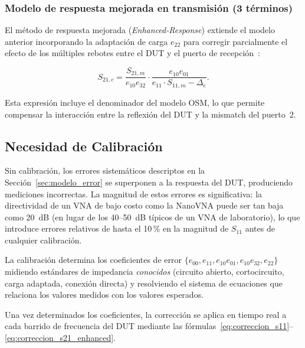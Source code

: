 \subsubsection{Modelo de respuesta mejorada en transmisión (3 términos)}

El método de respuesta mejorada (\emph{Enhanced-Response}) extiende el modelo
anterior incorporando la adaptación de carga $e_{22}$ para corregir
parcialmente el efecto de los múltiples rebotes entre el DUT y el puerto de
recepción~\cite{rytting1987}:

\begin{equation}
    S_{21,c} = \frac{S_{21,m}}{e_{10}e_{32}}
               \cdot
               \frac{e_{10}e_{01}}{e_{11}\cdot S_{11,m} - \Delta_e}.
    \label{eq:correccion_s21_enhanced}
\end{equation}

Esta expresión incluye el denominador del modelo OSM, lo que permite compensar
la interacción entre la reflexión del DUT y la mismatch del puerto~2.

\newpage
\Encabezado

\subsection{Necesidad de Calibración}
\label{sec:necesidad_cal}

Sin calibración, los errores sistemáticos descriptos en la
Sección~\ref{sec:modelo_error} se superponen a la respuesta del DUT,
produciendo mediciones incorrectas. La magnitud de estos errores es
significativa: la directividad de un VNA de bajo costo como la NanoVNA
puede ser tan baja como 20~dB (en lugar de los 40--50~dB típicos de un VNA
de laboratorio), lo que introduce errores relativos de hasta el 10\,\% en
la magnitud de $S_{11}$ antes de cualquier calibración.

La calibración determina los coeficientes de error $\{e_{00}, e_{11},
e_{10}e_{01}, e_{10}e_{32}, e_{22}\}$ midiendo estándares de impedancia
\emph{conocidos} (circuito abierto, cortocircuito, carga adaptada, conexión
directa) y resolviendo el sistema de ecuaciones que relaciona los valores
medidos con los valores esperados.

Una vez determinados los coeficientes, la corrección se aplica en tiempo real
a cada barrido de frecuencia del DUT mediante las
fórmulas~\eqref{eq:correccion_s11}--\eqref{eq:correccion_s21_enhanced}.

